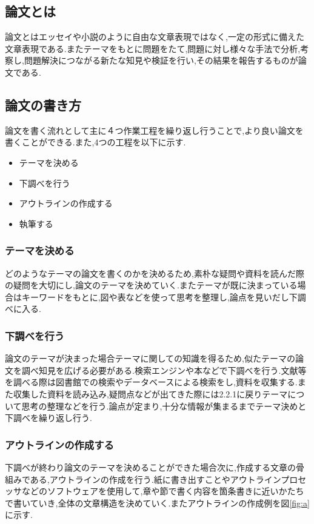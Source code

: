 \documentclass[a4j,12pt]{jarticle}
\begin{document}
\subsection{論文とは}
論文とはエッセイや小説のように自由な文章表現ではなく,一定の形式に備えた文章表現である.またテーマをもとに問題をたて,問題に対し様々な手法で分析,考察し,問題解決につながる新たな知見や検証を行い,その結果を報告するものが論文である\cite{ren1}.

\subsection{論文の書き方}
論文を書く流れとして主に４つ作業工程を繰り返し行うことで,より良い論文を書くことができる.また,4つの工程を以下に示す.
\begin{itemize}
  \item テーマを決める
  \item 下調べを行う
  \item アウトラインの作成する
  \item 執筆する
\end{itemize}
\subsubsection{テーマを決める}
どのようなテーマの論文を書くのかを決めるため,素朴な疑問や資料を読んだ際の疑問を大切にし,論文のテーマを決めていく.またテーマが既に決まっている場合はキーワードをもとに,図や表などを使って思考を整理し,論点を見いだし下調べに入る.

\subsubsection{下調べを行う}
論文のテーマが決まった場合テーマに関しての知識を得るため,似たテーマの論文を調べ知見を広げる必要がある.検索エンジンや本などで下調べを行う.文献等を調べる際は図書館での検索やデータベースによる検索をし,資料を収集する.また収集した資料を読み込み,疑問点などが出てきた際には2.2.1に戻りテーマについて思考の整理などを行う.論点が定まり,十分な情報が集まるまでテーマ決めと下調べを繰り返し行う.

\subsubsection{アウトラインの作成する}
下調べが終わり論文のテーマを決めることができた場合次に,作成する文章の骨組みである,アウトラインの作成を行う.紙に書き出すことやアウトラインプロセッサなどのソフトウェアを使用して,章や節で書く内容を箇条書きに近いかたちで書いていき,全体の文章構造を決めていく.またアウトラインの作成例を図\ref{fig:a}に示す.
\end{document}
